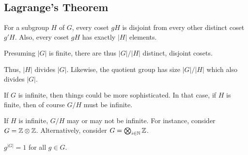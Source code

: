 \documentclass[11pt, oneside]{amsart}
\begin{document}
\begin{remark}

\end{remark}

\subsection{Lagrange's Theorem}

\begin{theorem}

  For a subgroup $H$ of $G$, every coset $gH$ is disjoint
  from every other distinct coset $g'H$. Also, every coset $gH$ has
  exactly $|H|$ elements.

  Presuming $|G|$ is finite, there are thus $|G|/|H|$ distinct, disjoint
  cosets.

  Thus, $|H|$ divides $|G|$. Likewise, the quotient group has size
  $|G|/|H|$ which also divides $|G|$.
\end{theorem}

\begin{remark}
  If $G$ is infinite, then things could be more sophisticated. In that
  case, if $H$ is finite, then of course $G/H$ must be infinite.

  If $H$ is infinite, $G/H$ may or may not be infinite. For instance,
  consider $G = \mathbb{Z} \otimes \mathbb{Z}$. Alternatively, consider $G =
  \bigotimes_{i \in \mathbb{N}} \mathbb{Z}$.
\end{remark}

\begin{corollary}

  $g^{|G|} = 1$ for all $g \in G$.
\end{corollary}



\end{document}
